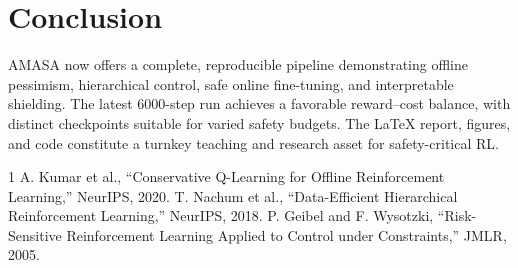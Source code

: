 \documentclass[conference]{IEEEtran}
\begin{document}
\section{Conclusion}
AMASA now offers a complete, reproducible pipeline demonstrating offline pessimism, hierarchical control, safe online fine-tuning, and interpretable shielding. The latest 6000-step run achieves a favorable reward--cost balance, with distinct checkpoints suitable for varied safety budgets. The LaTeX report, figures, and code constitute a turnkey teaching and research asset for safety-critical RL.


\begin{thebibliography}{1}
 A. Kumar et al., ``Conservative Q-Learning for Offline Reinforcement Learning,'' NeurIPS, 2020.
 T. Nachum et al., ``Data-Efficient Hierarchical Reinforcement Learning,'' NeurIPS, 2018.
 P. Geibel and F. Wysotzki, ``Risk-Sensitive Reinforcement Learning Applied to Control under Constraints,'' JMLR, 2005.
\end{thebibliography}
\end{document}
